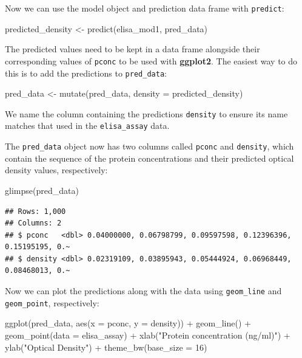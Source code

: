 \documentclass[
]{book}
\newenvironment{Shaded}{\begin{snugshade}}{\end{snugshade}}
\newcommand{\AttributeTok}[1]{\textcolor[rgb]{0.77,0.63,0.00}{#1}}
\newcommand{\DecValTok}[1]{\textcolor[rgb]{0.00,0.00,0.81}{#1}}
\newcommand{\FunctionTok}[1]{\textcolor[rgb]{0.00,0.00,0.00}{#1}}
\newcommand{\NormalTok}[1]{#1}
\newcommand{\OtherTok}[1]{\textcolor[rgb]{0.56,0.35,0.01}{#1}}
\newcommand{\SpecialCharTok}[1]{\textcolor[rgb]{0.00,0.00,0.00}{#1}}
\newcommand{\StringTok}[1]{\textcolor[rgb]{0.31,0.60,0.02}{#1}}
\begin{document}
Now we can use the model object and prediction data frame with \texttt{predict}:

\begin{Shaded}
\begin{Highlighting}[]
\NormalTok{predicted\_density }\OtherTok{\textless{}{-}} \FunctionTok{predict}\NormalTok{(elisa\_mod1, pred\_data)}
\end{Highlighting}
\end{Shaded}

The predicted values need to be kept in a data frame alongside their corresponding values of \texttt{pconc} to be used with \textbf{ggplot2}. The easiest way to do this is to add the predictions to \texttt{pred\_data}:

\begin{Shaded}
\begin{Highlighting}[]
\NormalTok{pred\_data }\OtherTok{\textless{}{-}} \FunctionTok{mutate}\NormalTok{(pred\_data, }\AttributeTok{density =}\NormalTok{ predicted\_density)}
\end{Highlighting}
\end{Shaded}

We name the column containing the predictions \texttt{density} to ensure its name matches that used in the \texttt{elisa\_assay} data.

The \texttt{pred\_data} object now has two columns called \texttt{pconc} and \texttt{density}, which contain the sequence of the protein concentrations and their predicted optical density values, respectively:

\begin{Shaded}
\begin{Highlighting}[]
\FunctionTok{glimpse}\NormalTok{(pred\_data)}
\end{Highlighting}
\end{Shaded}

\begin{verbatim}
## Rows: 1,000
## Columns: 2
## $ pconc   <dbl> 0.04000000, 0.06798799, 0.09597598, 0.12396396, 0.15195195, 0.~
## $ density <dbl> 0.02319109, 0.03895943, 0.05444924, 0.06968449, 0.08468013, 0.~
\end{verbatim}

Now we can plot the predictions along with the data using \texttt{geom\_line} and \texttt{geom\_point}, respectively:

\begin{Shaded}
\begin{Highlighting}[]
\FunctionTok{ggplot}\NormalTok{(pred\_data, }\FunctionTok{aes}\NormalTok{(}\AttributeTok{x =}\NormalTok{ pconc, }\AttributeTok{y =}\NormalTok{ density)) }\SpecialCharTok{+} 
  \FunctionTok{geom\_line}\NormalTok{() }\SpecialCharTok{+} \FunctionTok{geom\_point}\NormalTok{(}\AttributeTok{data =}\NormalTok{ elisa\_assay) }\SpecialCharTok{+} 
  \FunctionTok{xlab}\NormalTok{(}\StringTok{"Protein concentration (ng/ml)"}\NormalTok{) }\SpecialCharTok{+} \FunctionTok{ylab}\NormalTok{(}\StringTok{"Optical Density"}\NormalTok{) }\SpecialCharTok{+} 
  \FunctionTok{theme\_bw}\NormalTok{(}\AttributeTok{base\_size =} \DecValTok{16}\NormalTok{)}
\end{Highlighting}
\end{Shaded}
\end{document}
